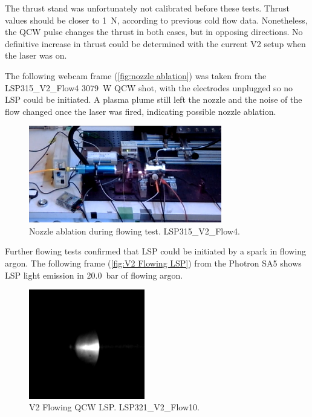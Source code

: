         The thrust stand was unfortunately not calibrated before these tests. Thrust values should be closer to \qty{1}{N}, according to previous cold flow data. Nonetheless, the QCW pulse changes the thrust in both cases, but in opposing directions. No definitive increase in thrust could be determined with the current V2 setup when the laser was on.

        The following webcam frame (\autoref{fig:nozzle ablation}) was taken from the LSP315\_V2\_Flow4 \qty{3079}{W} QCW shot, with the electrodes unplugged so no LSP could be initiated. A plasma plume still left the nozzle and the noise of the flow changed once the laser was fired, indicating possible nozzle ablation.

        \begin{figure}[!ht]
            \centering
            \includegraphics[width=0.75\textwidth]{assets/5 discussion/Nozzle ablation.png}
            \caption{Nozzle ablation during flowing test. LSP315\_V2\_Flow4.}
            \label{fig:nozzle ablation}
        \end{figure}

        Further flowing tests confirmed that LSP could be initiated by a spark in flowing argon. The following frame (\autoref{fig:V2 Flowing LSP}) from the Photron SA5 shows LSP light emission in \qty{20.0}{bar} of flowing argon.

        \begin{figure}[!ht]
            \centering
            \includegraphics[width=0.45\textwidth]{assets/4 experiments/LSP321_V2_FLOW10.png}
            \caption{V2 Flowing QCW LSP. LSP321\_V2\_Flow10.}
            \label{fig:V2 Flowing LSP}
        \end{figure}

        



